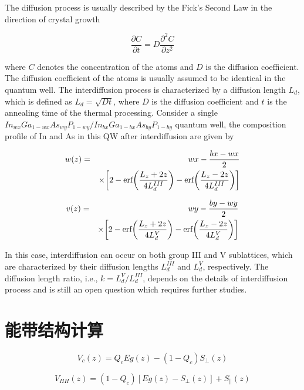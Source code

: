 \documentclass{ZJUthesis}
\begin{document}
The diffusion process is usually described by the Fick's Second Law in the direction of crystal growth

\begin{equation}
  \frac{\partial{C}}{\partial{t}}=D\frac{\partial^2{C}}{\partial{z^2}}
\end{equation}

where $C$ denotes the concentration of the atoms and $D$ is the diffusion coefficient. The diffusion coefficient of the atoms is usually assumed to be identical in the quantum well. The interdiffusion process is characterized by a diffusion length $L_d$, which is defined as $L_d=\sqrt{Dt}$, where $D$ is the diffusion coefficient and $t$ is the annealing time of the thermal processing. Consider a single $In_{wx}Ga_{1-wx}As_{wy}P_{1-wy}/In_{bx}Ga_{1-bx}As_{by}P_{1-by}$ quantum well, the composition profile of In and As in this QW after interdiffusion are given by

\begin{eqnarray}
    w(z)&=&wx-\frac{bx-wx}{2} \notag\\
        &&\times \biggr[2-\textrm{erf}\biggr(\frac{L_z+2z}{4L_d^{III}}\biggr)
        -\textrm{erf}\biggr(\frac{L_z-2z}{4L_d^{III}}\biggr)\biggr]
\end{eqnarray}

\begin{eqnarray}
    v(z)&=&wy-\frac{by-wy}{2} \notag\\
        &&\times \biggr[2-\textrm{erf}\biggr(\frac{L_z+2z}{4L_d^{V}}\biggr)
        -\textrm{erf}\biggr(\frac{L_z-2z}{4L_d^{V}}\biggr)\biggr]
\end{eqnarray}

In this case, interdiffusion can occur on both group III and V sublattices, which are characterized by their diffusion lengths $L_d^{III}$ and $L_d^V$, respectively. The diffusion length ratio, i.e., $k=L_d^V/L_d^{III}$, depends on the details of interdiffusion process and is still an open question which requires further studies.


\section{能带结构计算}

\begin{equation}
    \label{V_c}
    V_c(z)
        = Q_c Eg(z) - (1-Q_c)S_\perp(z)
\end{equation}

\begin{equation}
    \label{V_HH}
    V_{HH}(z)
        = (1-Q_c)[Eg(z) - S_\perp(z)] + S_\parallel(z)
\end{equation}
\end{document}

